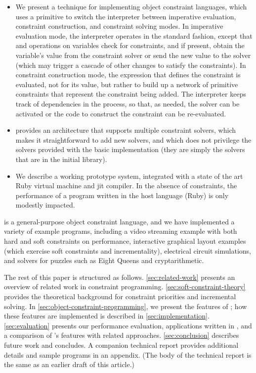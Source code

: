 \begin{itemize}
\item We present a technique for implementing object constraint
  languages, which uses a primitive to switch the interpreter between
  imperative evaluation, constraint construction, and constraint
  solving modes.  In imperative evaluation mode, the interpreter
  operates in the standard fashion, except that \load and \store
  operations on variables check for constraints, and if present,
  obtain the variable's value from the
  constraint solver or send the new value to the solver (which may
  trigger a cascade of other changes to satisfy the constraints).  In
  constraint construction mode, the expression that defines the
  constraint is evaluated, not for its value, but rather to build up a
  network of primitive constraints that represent the constraint being
  added.  The interpreter keeps track of dependencies in the process,
  so that, as needed, the solver can be activated or the code to
  construct the constraint can be re-evaluated.
\item \langname provides an architecture that supports multiple
  constraint solvers, which makes it straightforward to add new
  solvers, and which does not privilege the solvers provided with the
  basic implementation (they are simply the solvers that are in the
  initial library).
\item We describe a working prototype system, integrated with a state
  of the art Ruby virtual machine and \ac{jit} compiler. In the
  absence of constraints, the performance of a program written in the
  host language (Ruby) is only modestly impacted.
\end{itemize}

\toolname is a general-purpose object constraint language, and we have
implemented a variety of example programs, including a video streaming
example with both hard and soft constraints on performance,
interactive graphical layout examples (which exercise soft constraints
and incrementality), electrical circuit simulations, and solvers for
puzzles such as Eight Queens and cryptarithmetic.

The rest of this paper is structured as
follows. \autoref{sec:related-work} presents an overview of related
work in constraint programming. \autoref{sec:soft-constraint-theory}
provides the theoretical background for constraint priorities and
incremental solving. In \autoref{sec:object-constraint-programming},
we present the features of \langname; how these features are
implemented is described in
\autoref{sec:implementation}. \autoref{sec:evaluation} presents our
performance evaluation, applications written in \toolname, and a
comparison of \langname's features with related
approaches. \autoref{sec:conclusion} describes future work and
concludes.  A companion technical report \cite{felgentreff-babelsberg-tr} 
provides additional details and sample \langname programs in an
appendix.  (The body of the technical report is the same as an earlier
draft of this article.)

